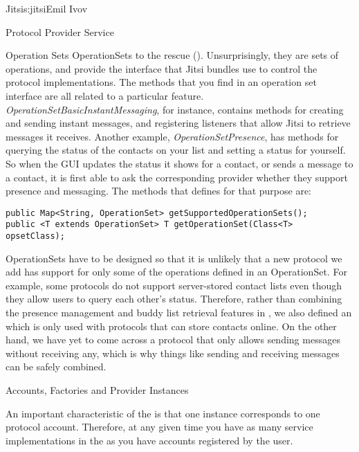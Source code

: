 \begin{aosachapter}{Jitsi}{s:jitsi}{Emil Ivov}
\begin{aosasect1}{Protocol Provider Service}
\begin{aosasect2}{Operation Sets}
OperationSets to the rescue
(). Unsurprisingly, they are sets of
operations, and provide the interface that Jitsi bundles use to
control the protocol implementations. The methods that you find in an
operation set interface are all related to a particular feature.
\emph{OperationSetBasicInstantMessaging}, for instance, contains
methods for creating and sending instant messages, and registering
listeners that allow Jitsi to retrieve messages it receives. Another
example, \emph{OperationSetPresence}, has methods for querying the
status of the contacts on your list and setting a status for
yourself. So when the GUI updates the status it shows for a contact,
or sends a message to a contact, it is first able to ask the
corresponding provider whether they support presence and
messaging. The methods that  defines for
that purpose are:

\begin{verbatim}
public Map<String, OperationSet> getSupportedOperationSets();
public <T extends OperationSet> T getOperationSet(Class<T> opsetClass);
\end{verbatim}

OperationSets have to be designed so that it is unlikely that a new
protocol we add has support for only some of the operations defined in
an OperationSet. For example, some protocols do not support server-stored
contact lists even though they allow users to query each other's status. 
Therefore, rather than combining the presence management and buddy list 
retrieval features in , we also defined an
 which is only used with protocols
that can store contacts online. On the other hand, we have yet to come 
across a protocol that only allows sending messages without receiving 
any, which is why things like sending and receiving messages can be 
safely combined.


\end{aosasect2}

\begin{aosasect2}{Accounts, Factories and Provider Instances}

An important characteristic of the  is
that one instance corresponds to one protocol account. Therefore, at
any given time you have as many service implementations in the
 as you have accounts registered by the user.


\end{aosasect2}
\end{aosasect1}
\end{aosachapter}
